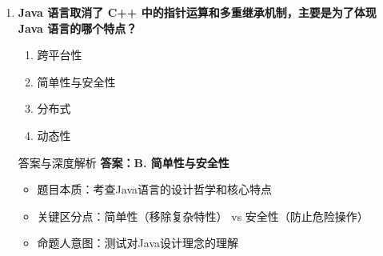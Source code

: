 \documentclass[12pt, a4paper]{ctexart}
\begin{document}
\begin{enumerate}[label=\textbf{\arabic*.}]
\begin{bluebox}{答案与深度解析}
		      \begin{itemize}[leftmargin=*, nosep]
			      \item 近年真题规律：
			            \begin{itemize}
				            \item 90\%考题选择B
				            \item 常见干扰项：A（源文件）和C（exe文件）
				            \item 此题必须100\%正确
			            \end{itemize}

			      \item 考场秒杀：
			            \begin{enumerate}
				            \item java命令运行的是.class文件
				            \item 运行时不需要.class后缀
			            \end{enumerate}
		      \end{itemize}
	      \end{bluebox}

	      \newpage

	\item \textbf{Java 语言取消了 C++ 中的指针运算和多重继承机制，主要是为了体现 Java 语言的哪个特点？}
	      \begin{enumerate}[label=\Alph*.]
		      \item 跨平台性
		      \item 简单性与安全性
		      \item 分布式
		      \item 动态性
	      \end{enumerate}

	      \begin{bluebox}{答案与深度解析}
		      \textbf{答案：B. 简单性与安全性}

		      \begin{itemize}[leftmargin=*, nosep]
			      \item 题目本质：考查Java语言的设计哲学和核心特点
			      \item 关键区分点：简单性（移除复杂特性） vs 安全性（防止危险操作）
			      \item 命题人意图：测试对Java设计理念的理解
		      \end{itemize}


\end{bluebox}
\end{enumerate}
\end{document}
